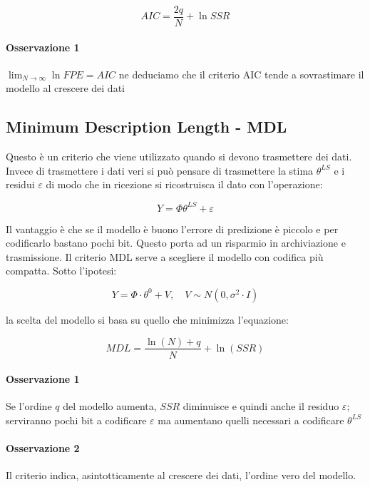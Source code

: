     \[ AIC=\frac{2q}{N}+\ln SSR \]

\paragraph{Osservazione 1} $\lim_{N \rightarrow \infty} \ln FPE = AIC $ ne deduciamo che il criterio AIC tende a sovrastimare il modello al crescere dei dati
\subsection{Minimum Description Length - MDL}
Questo è un criterio che viene utilizzato quando si devono trasmettere dei dati. Invece di trasmettere i dati veri si può pensare di trasmettere la stima $\theta^{LS}$ e i residui $\varepsilon$ di modo che in ricezione si ricostruisca il dato con l'operazione:

    \[ Y=\Phi\theta^{LS}+\varepsilon \]

Il vantaggio è che se il modello è buono l'errore di predizione è piccolo e per codificarlo bastano pochi bit. Questo porta ad un risparmio in archiviazione e trasmissione.
Il criterio MDL serve a scegliere il modello con codifica più compatta. Sotto l'ipotesi:

    \[ Y=\Phi\cdot\theta^0+V, \quad V\sim N(0,\sigma^2\cdot I) \]

la scelta del modello si basa su quello che minimizza l'equazione:

    \[ MDL=\frac{\ln(N)+q}{N}+\ln(SSR) \]

\paragraph{Osservazione 1} Se l'ordine $q$ del modello aumenta, $SSR$ diminuisce e quindi anche il residuo $\varepsilon$; serviranno pochi bit a codificare $\varepsilon$ ma aumentano quelli necessari a codificare $\theta^{LS}$
\paragraph{Osservazione 2} Il criterio indica, asintotticamente al crescere dei dati, l'ordine vero del modello.
